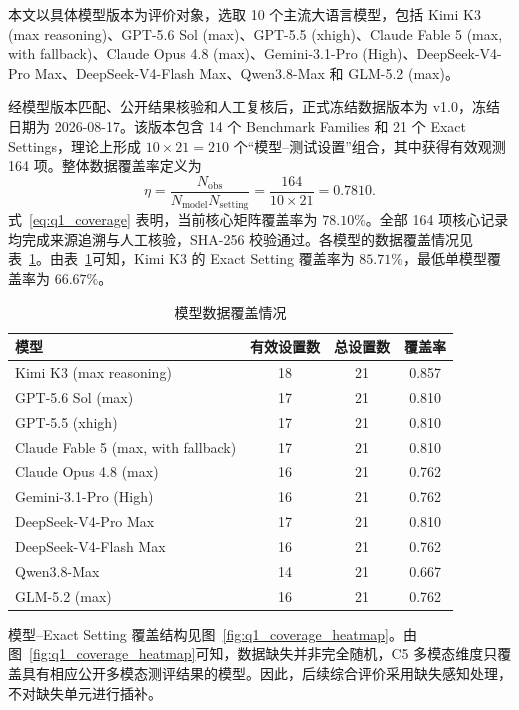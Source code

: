 本文以具体模型版本为评价对象，选取 10 个主流大语言模型，包括 Kimi K3 (max reasoning)、GPT-5.6 Sol (max)、GPT-5.5 (xhigh)、Claude Fable 5 (max, with fallback)、Claude Opus 4.8 (max)、Gemini-3.1-Pro (High)、DeepSeek-V4-Pro Max、DeepSeek-V4-Flash Max、Qwen3.8-Max 和 GLM-5.2 (max)。

经模型版本匹配、公开结果核验和人工复核后，正式冻结数据版本为 v1.0，冻结日期为 2026-08-17。该版本包含 14 个 Benchmark Families 和 21 个 Exact Settings，理论上形成 \(10\times21=210\) 个“模型--测试设置”组合，其中获得有效观测 164 项。整体数据覆盖率定义为
\begin{equation}
\eta
=
\frac{N_{\mathrm{obs}}}{N_{\mathrm{model}}N_{\mathrm{setting}}}
=
\frac{164}{10\times21}
=0.7810.
\label{eq:q1_coverage}
\end{equation}
式~\eqref{eq:q1_coverage} 表明，当前核心矩阵覆盖率为 \(78.10\%\)。全部 164 项核心记录均完成来源追溯与人工核验，SHA-256 校验通过。各模型的数据覆盖情况见表~\ref{tab:q1_model_coverage}。由表~\ref{tab:q1_model_coverage}可知，Kimi K3 的 Exact Setting 覆盖率为 \(85.71\%\)，最低单模型覆盖率为 \(66.67\%\)。

\begin{table}[htbp]
\centering
\caption{模型数据覆盖情况}
\label{tab:q1_model_coverage}
\begin{tabular}{lccc}
\toprule
模型 & 有效设置数 & 总设置数 & 覆盖率 \\
\midrule
Kimi K3 (max reasoning) & 18 & 21 & 0.857 \\
GPT-5.6 Sol (max) & 17 & 21 & 0.810 \\
GPT-5.5 (xhigh) & 17 & 21 & 0.810 \\
Claude Fable 5 (max, with fallback) & 17 & 21 & 0.810 \\
Claude Opus 4.8 (max) & 16 & 21 & 0.762 \\
Gemini-3.1-Pro (High) & 16 & 21 & 0.762 \\
DeepSeek-V4-Pro Max & 17 & 21 & 0.810 \\
DeepSeek-V4-Flash Max & 16 & 21 & 0.762 \\
Qwen3.8-Max & 14 & 21 & 0.667 \\
GLM-5.2 (max) & 16 & 21 & 0.762 \\
\bottomrule
\end{tabular}
\end{table}

模型--Exact Setting 覆盖结构见图~\ref{fig:q1_coverage_heatmap}。由图~\ref{fig:q1_coverage_heatmap}可知，数据缺失并非完全随机，C5 多模态维度只覆盖具有相应公开多模态测评结果的模型。因此，后续综合评价采用缺失感知处理，不对缺失单元进行插补。

